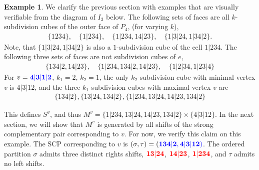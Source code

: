 \documentclass{amsart}
\newcommand{\red}{\color{red}} %
\newcommand{\blue}{\color{blue}} %
\theoremstyle{definition}
\newtheorem{example}[theorem]{Example}
\newcommand{\SCP}{\mathrm{SCP}}
\newcommand{\subdivpairsv}{S^v}
\newcommand{\maxsubdivpairsv}{M^v}
\begin{document}
\begin{example}\label{ex:subdivision cubes}
We clarify the previous section with examples that are visually verifiable from the diagram of $I_3$ below.
The following sets of faces are all $k$-subdivision cubes of the outer face of $P_4$, (for varying $k$),
\begin{align*}
	\{1234\},\quad \{1|234\},\quad \{1|234, 14|23\},\quad \{1|3|24,1|34|2\}.
\end{align*}
Note, that $\{1|3|24,1|34|2\}$ is also a $1$-subdivision cube of the cell $1|234$.
The following three sets of faces are not subdivision cubes of $e$,
\begin{align*}
	\{134|2, 14|23\},\quad \{1|234, 134|2, 14|23\}, \quad \{1|2|34,1|23|4\}
\end{align*}
For $v = \blue{\mathbf{4|3|1|2}}$, $k_1=2$, $k_2=1$, the only $k_2$-subdivision cube with minimal vertex $v$ is $4|3|12$, and the three $k_1$-subdivision cubes with maximal vertex $v$ are
\begin{align*}
	\{134|2\}, \{13|24, 134|2\}, \{ 1|234, 13|24, 14|23, 134|2\}
\end{align*}

This defines $\subdivpairsv$, and thus $\maxsubdivpairsv=\{ 1|234, 13|24, 14|23, 134|2\} \times \{4|3|12\}$.
In the next section, we will show that $\maxsubdivpairsv$ is generated by all shifts of the strong complementary pair corresponding to $v$.
For now, we verify this claim on this example.
The $\SCP$ corresponding to $v$ is $(\sigma,\tau) = (\blue{\mathbf{134|2}},\blue{\mathbf{4|3|12}} )$.
The ordered partition $\sigma$ admits three distinct rights shifts, $\red{\mathbf{13|24}}$, $\red{\mathbf{14|23}}$, $\red{\mathbf{1|234}}$, and $\tau$ admits no left shifts.


\end{example}
\end{document}
